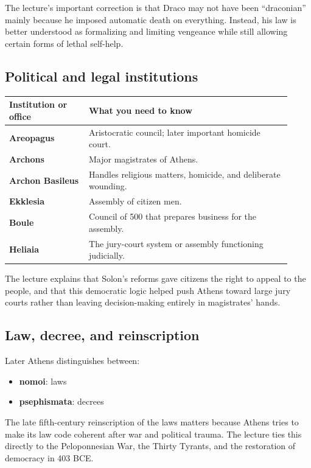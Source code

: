 \documentclass[11pt]{article}
\newcommand{\keyterm}[1]{\textbf{#1}}
\begin{document}
The lecture's important correction is that Draco may not have been ``draconian'' mainly because he imposed automatic death on everything. Instead, his law is better understood as formalizing and limiting vengeance while still allowing certain forms of lethal self-help.

\subsection*{Political and legal institutions}
\begin{tabular}{@{}p{0.26\linewidth}p{0.66\linewidth}@{}}
\toprule
\textbf{Institution or office} & \textbf{What you need to know} \\
\midrule
\keyterm{Areopagus} & Aristocratic council; later important homicide court. \\
\keyterm{Archons} & Major magistrates of Athens. \\
\keyterm{Archon Basileus} & Handles religious matters, homicide, and deliberate wounding. \\
\keyterm{Ekklesia} & Assembly of citizen men. \\
\keyterm{Boule} & Council of 500 that prepares business for the assembly. \\
\keyterm{Heliaia} & The jury-court system or assembly functioning judicially. \\
\bottomrule
\end{tabular}

The lecture explains that Solon's reforms gave citizens the right to appeal to the people, and that this democratic logic helped push Athens toward large jury courts rather than leaving decision-making entirely in magistrates' hands.

\subsection*{Law, decree, and reinscription}
Later Athens distinguishes between:

\begin{itemize}
\item \keyterm{nomoi}: laws
\item \keyterm{psephismata}: decrees
\end{itemize}

The late fifth-century reinscription of the laws matters because Athens tries to make its law code coherent after war and political trauma. The lecture ties this directly to the Peloponnesian War, the Thirty Tyrants, and the restoration of democracy in 403 BCE.
\end{document}
